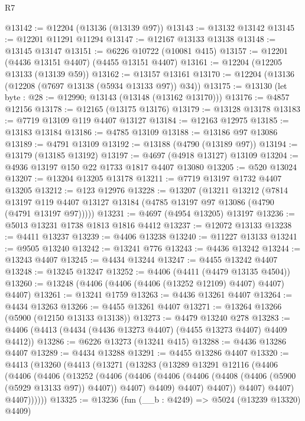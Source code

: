 \begin{lexlean}{R7}
\begin{coremodule}
@13142 := @12204 (@13136 (@13139 @97))
@13143 := @13132 @13142
@13145 := @12201 @11291 @11294
@13147 := @12167 @13133 @13138
@13148 := @13145 @13147
@13151 := @6226 @10722 (@10081 @415)
@13157 := @12201 (@4436 @13151 @4407) (@4455 @13151 @4407)
@13161 := @12204 (@12205 @13133 (@13139 @59))
@13162 := @13157 @13161
@13170 := @12204 (@13136 (@12208 (@7697 @13138 (@5934 @13133 @97)) @34))
@13175 := @13130 (let byte : @28 := @12990; @13143 (@13148 (@13162 @13170)))
@13176 := @4857 @12156
@13178 := @12165 (@13175 @13176)
@13179 := @13128 @13178
@13183 := @7719 @13109 @119 @4407 @13127
@13184 := @12163 @12975
@13185 := @13183 @13184
@13186 := @4785 @13109
@13188 := @13186 @97 @13086
@13189 := @4791 @13109
@13192 := @13188 (@4790 (@13189 @97))
@13194 := @13179 (@13185 @13192)
@13197 := @4697 (@4918 @13127) @13109
@13204 := @4936 @13197 @150 @22 @1733 @1817 @4407 @13080
@13205 := @520 @13024
@13207 := @13204 @13205 @13178
@13211 := @7719 @13197 @1732 @4407 @13205
@13212 := @123 @12976
@13228 := @13207
    (@13211
      @13212
      (@7814 @13197 @119 @4407 @13127 @13184 (@4785 @13197 @97 @13086 (@4790 (@4791 @13197 @97)))))
@13231 := @4697 (@4954 @13205) @13197
@13236 := @5013 @13231 @1738 @1813 @1816 @4412
@13237 := @12072 @13133
@13238 := @4411 @13237
@13239 := @4406 @13238
@13240 := @11227 @13133
@13241 := @9505 @13240
@13242 := @13241 @776
@13243 := @4436 @13242
@13244 := @13243 @4407
@13245 := @4434 @13244
@13247 := @4455 @13242 @4407
@13248 := @13245 @13247
@13252 := @4406 (@4411 (@4479 @13135 @4504))
@13260 := @13248 (@4406 (@4406 (@4406 (@13252 @12109) @4407) @4407) @4407)
@13261 := @13241 @1759
@13263 := @4436 @13261 @4407
@13264 := @4434 @13263
@13266 := @4455 @13261 @4407
@13271 := @13264 @13266 (@5900 (@12150 @13133 @13138))
@13273 := @4479 @13240 @278
@13283 := @4406 (@4413 (@4434 (@4436 @13273 @4407) (@4455 @13273 @4407) @4409 @4412))
@13286 := @6226 @13273 (@13241 @415)
@13288 := @4436 @13286 @4407
@13289 := @4434 @13288
@13291 := @4455 @13286 @4407
@13320 := @4413
    (@13260
      (@4413
        (@13271
          (@13283
            (@13289
              @13291
              @12116
              (@4406
                (@4406
                  (@4406
                    (@13252
                      (@4406
                        (@4406
                          (@4406
                            (@4406 (@4408 (@4406 (@5900 (@5929 @13133 @97)) @4407)) @4407)
                            @4409)
                          @4407)
                        @4407))
                    @4407)
                  @4407)
                @4407))))))
@13325 := @13236 (fun (__b : @4249) => @5024 (@13239 @13320) @4409)

\end{coremodule}
\end{lexlean}
